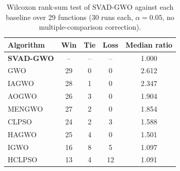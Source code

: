 \begin{table}[t]
\centering
\caption{Wilcoxon rank-sum test of SVAD-GWO against each baseline over 29 functions (30 runs each, $\alpha=0.05$, no multiple-comparison correction).}
\label{tab:wlt}
\begin{tabular}{lcccc}
\hline
Algorithm & Win & Tie & Loss & Median ratio \\
\hline
\textbf{SVAD-GWO} & -- & -- & -- & 1.000 \\
GWO & 29 & 0 & 0 & 2.612 \\
IAGWO & 28 & 1 & 0 & 2.347 \\
AOGWO & 26 & 3 & 0 & 1.904 \\
MENGWO & 27 & 2 & 0 & 1.854 \\
CLPSO & 24 & 2 & 3 & 1.588 \\
HAGWO & 25 & 4 & 0 & 1.501 \\
IGWO & 16 & 8 & 5 & 1.097 \\
HCLPSO & 13 & 4 & 12 & 1.091 \\
\hline
\end{tabular}
\end{table}